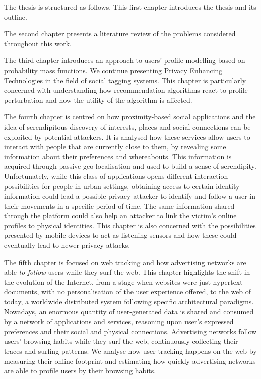 The thesis is structured as follows. This first chapter introduces the thesis and its outline.
 
The second chapter presents a literature review of the problems considered throughout this work.

The third chapter introduces an approach to users' profile modelling based on probability mass functions. We continue presenting Privacy Enhancing Technologies in the field of social tagging systems. This chapter is particularly concerned with understanding how recommendation algorithms react to profile perturbation and how the utility of the algorithm is affected.

The fourth chapter is centred on how proximity-based social applications and the idea of serendipitous discovery of interests, places and social connections can be exploited by potential attackers. It is analysed how these services allow users to interact with people that are currently close to them, by revealing some information about their preferences and whereabouts. This information is acquired through passive geo-localisation and used to build a sense of serendipity. Unfortunately, while this class of applications opens different interaction possibilities for people in urban settings, obtaining access to certain identity information could lead a possible privacy attacker to identify and follow a user in their movements in a specific period of time. The same information shared through the platform could also help an attacker to link the victim’s online profiles to physical identities. This chapter is also concerned with the possibilities presented by mobile devices to act as listening sensors and how these could eventually lead to newer privacy attacks.

The fifth chapter is focused on web tracking and how advertising networks are able \emph{to follow} users while they surf the web. This chapter highlights the shift in the evolution of the Internet, from a stage when websites were just hypertext documents, with no personalisation of the user experience offered, to the web of today, a worldwide distributed system following specific architectural paradigms. Nowadays, an enormous quantity of user-generated data is shared and consumed by a network of applications and services, reasoning upon user's expressed preferences and their social and physical connections. Advertising networks follow users’ browsing habits while they surf the web, continuously collecting their traces and surfing patterns. We analyse how user tracking happens on the web by measuring their online footprint and estimating how quickly advertising networks are able to profile users by their browsing habits.


